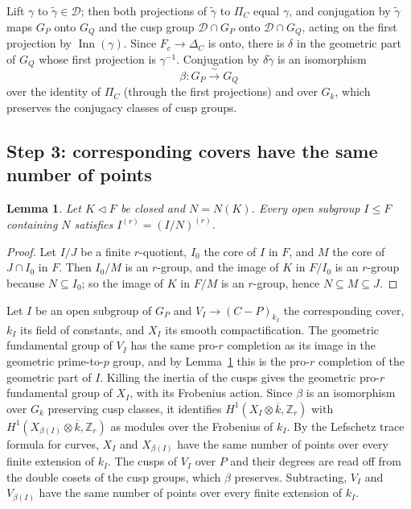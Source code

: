 \documentclass[11pt]{amsart}
\newtheorem{lemma}[thm]{Lemma}
\theoremstyle{remark}
\newcommand{\Z}{\mathbb Z}
\DeclareMathOperator{\Inn}{Inn}
\begin{document}
Lift $\gamma$ to $\tilde\gamma\in\mathcal D$; then both projections of $\tilde\gamma$ to $\Pi_C$ equal $\gamma$, and conjugation by $\tilde\gamma$ maps $G_P$ onto $G_Q$ and the cusp group $\mathcal D\cap G_P$ onto $\mathcal D\cap G_Q$, acting on the first projection by $\Inn(\gamma)$. Since $F_c\to\Delta_C$ is onto, there is $\delta$ in the geometric part of $G_Q$ whose first projection is $\gamma^{-1}$. Conjugation by $\delta\tilde\gamma$ is an isomorphism
\[
 \beta\colon G_P\xrightarrow{\ \sim\ }G_Q
\]
over the identity of $\Pi_C$ (through the first projections) and over $G_k$, which preserves the conjugacy classes of cusp groups.

\subsection{Step 3: corresponding covers have the same number of points}

\begin{lemma}\label{lem:rquot}
Let $K\triangleleft F$ be closed and $N=N(K)$. Every open subgroup $I\le F$ containing $N$ satisfies $I^{(r)}=(I/N)^{(r)}$.
\end{lemma}

\begin{proof}
Let $I/J$ be a finite $r$-quotient, $I_0$ the core of $I$ in $F$, and $M$ the core of $J\cap I_0$ in $F$. Then $I_0/M$ is an $r$-group, and the image of $K$ in $F/I_0$ is an $r$-group because $N\subseteq I_0$; so the image of $K$ in $F/M$ is an $r$-group, hence $N\subseteq M\subseteq J$.
\end{proof}

Let $I$ be an open subgroup of $G_P$ and $V_I\to(C-P)_{k_I}$ the corresponding cover, $k_I$ its field of constants, and $X_I$ its smooth compactification. The geometric fundamental group of $V_I$ has the same pro-$r$ completion as its image in the geometric prime-to-$p$ group, and by Lemma~\ref{lem:rquot} this is the pro-$r$ completion of the geometric part of $I$. Killing the inertia of the cusps gives the geometric pro-$r$ fundamental group of $X_I$, with its Frobenius action. Since $\beta$ is an isomorphism over $G_k$ preserving cusp classes, it identifies $H^1(X_I\otimes\overline k,\Z_r)$ with $H^1(X_{\beta(I)}\otimes\overline k,\Z_r)$ as modules over the Frobenius of $k_I$. By the Lefschetz trace formula for curves, $X_I$ and $X_{\beta(I)}$ have the same number of points over every finite extension of $k_I$. The cusps of $V_I$ over $P$ and their degrees are read off from the double cosets of the cusp groups, which $\beta$ preserves. Subtracting, $V_I$ and $V_{\beta(I)}$ have the same number of points over every finite extension of $k_I$.
\end{document}

